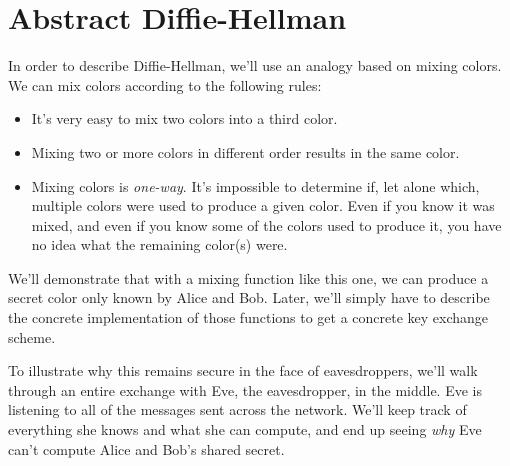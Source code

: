 \documentclass[11pt,ebook,table,dvipsnames]{memoir}
\begin{document}
\section{Abstract Diffie-Hellman\label{Diffie-Hellman}}
\label{sec-2-4-2}

In order to describe Diffie-Hellman, we'll use an analogy based on
mixing colors. We can mix colors according to the following rules:

\begin{itemize}
\item It's very easy to mix two colors into a third color.
\item Mixing two or more colors in different order results in the same
color.
\item Mixing colors is \emph{one-way}. It's impossible to determine if, let
alone which, multiple colors were used to produce a given color.
Even if you know it was mixed, and even if you know some of the
colors used to produce it, you have no idea what the remaining
color(s) were.
\end{itemize}

We'll demonstrate that with a mixing function like this one, we can
produce a secret color only known by Alice and Bob. Later, we'll
simply have to describe the concrete implementation of those
functions to get a concrete key exchange scheme.

To illustrate why this remains secure in the face of eavesdroppers,
we'll walk through an entire exchange with Eve, the eavesdropper, in
the middle. Eve is listening to all of the messages sent across the
network. We'll keep track of everything she knows and what she can
compute, and end up seeing \emph{why} Eve can't compute Alice and Bob's
shared secret.

\newcommand{\dhimg}[1] {
\raisebox{-0.5\height}{\texttt{[image: ./Illustrations/DiffieHellman/\#1.pdf]}}
}

\newcommand{\dhmix}[4] {
\begin{figure}[ht!]
\centering
\dhimg{#1}
\dhimg{#2}
\dhimg{Plus}
\dhimg{#3}
\dhimg{Equals}
\dhimg{#4}
\end{figure}
}

\newcommand{\dhknows}[2]{
\begin{figure}[ht!]
\centering
\dhimg{#1}
\foreach \i in {#2}{
\dhimg{\i}
}
\end{figure}}

\newcommand{\dhsendmixedsecret}[2]{
\begin{figure}[ht!]
\centering
\dhimg{#1}
\dhimg{#1MixedSecret}
\dhimg{Arrow}
\dhimg{#2}
\end{figure}
}
\end{document}
